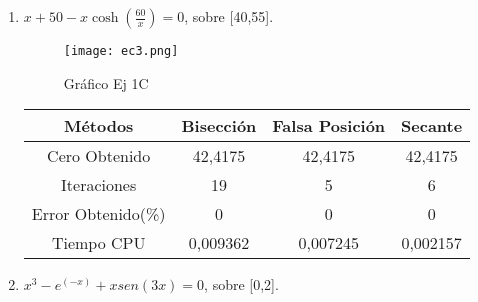 \documentclass{udpreport}
\begin{document}
\begin{enumerate}
\begin{enumerate}
        
    
    \item \(x + 50 -x\cosh(\frac{60}{x}) = 0 \), sobre [40,55].\\
        \begin{figure}[H]
            \centering
            \texttt{[image: ec3.png]}
            \caption{Gráfico Ej 1C}
        \end{figure}
            \begin{table}[H]
            \centering
           \begin{tabular} { |c|c|c|c|}
                \hline
                Métodos       & Bisección & Falsa Posición & Secante  \\
                \hline
                Cero Obtenido &  42,4175      &    42,4175     &      42,4175   \\
                \hline
                Iteraciones   &    19        &    5     &      6        \\
                \hline
                Error Obtenido(\%) &       0      &       0      &     0         \\
                \hline
                Tiempo CPU &       0,009362     &      0,007245    &     0,002157         \\
                 \hline
                \end{tabular}
            \end{table}
      

    
    \item \(x^3-e^(-x)+xsen(3x) = 0 \), sobre [0,2].\\
        

\end{enumerate}
\end{enumerate}
\end{document}
